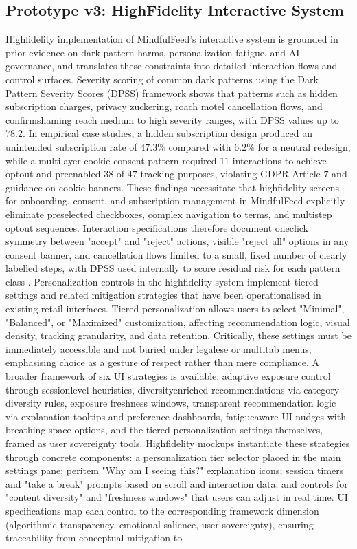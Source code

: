\documentclass{article}
\begin{document}
\subsection{Prototype v3: High\-Fidelity Interactive System}
\label{sec:prototype_v3_high_fidelity} High\-fidelity implementation of MindfulFeed's interactive system is grounded in prior evidence on dark pattern harms, personalization fatigue, and AI governance, and translates these constraints into detailed interaction flows and control surfaces. Severity scoring of common dark patterns using the Dark Pattern Severity Scores (DPSS) framework shows that patterns such as hidden subscription charges, privacy zuckering, roach motel cancellation flows, and confirmshaming reach medium to high severity ranges, with DPSS values up to $78.2$. In empirical case studies, a hidden subscription design produced an unintended subscription rate of $47.3\%$ compared with $6.2\%$ for a neutral redesign, while a multi\-layer cookie consent pattern required $11$ interactions to achieve opt\-out and pre\-enabled $38$ of $47$ tracking purposes, violating GDPR Article $7$ and guidance on cookie banners. These findings necessitate that high\-fidelity screens for onboarding, consent, and subscription management in MindfulFeed explicitly eliminate preselected checkboxes, complex navigation to terms, and multi\-step opt\-out sequences. Interaction specifications therefore document one\-click symmetry between "accept" and "reject" actions, visible "reject all" options in any consent banner, and cancellation flows limited to a small, fixed number of clearly labelled steps, with DPSS used internally to score residual risk for each pattern class \parencites[7]{4807303}. Personalization controls in the high\-fidelity system implement tiered settings and related mitigation strategies that have been operationalised in existing retail interfaces. Tiered personalization allows users to select "Minimal", "Balanced", or "Maximized" customization, affecting recommendation logic, visual density, tracking granularity, and data retention. Critically, these settings must be immediately accessible and not buried under legalese or multi\-tab menus, emphasising choice as a gesture of respect rather than mere compliance. A broader framework of six UI strategies is available: adaptive exposure control through session\-level heuristics, diversity\-enriched recommendations via category diversity rules, exposure freshness windows, transparent recommendation logic via explanation tooltips and preference dashboards, fatigue\-aware UI nudges with breathing space options, and the tiered personalization settings themselves, framed as user sovereignty tools. High\-fidelity mockups instantiate these strategies through concrete components: a personalization tier selector placed in the main settings pane; per\-item "Why am I seeing this?" explanation icons; session timers and "take a break" prompts based on scroll and interaction data; and controls for "content diversity" and "freshness windows" that users can adjust in real time. UI specifications map each control to the corresponding framework dimension (algorithmic transparency, emotional salience, user sovereignty), ensuring traceability from conceptual mitigation to 
\end{document}
